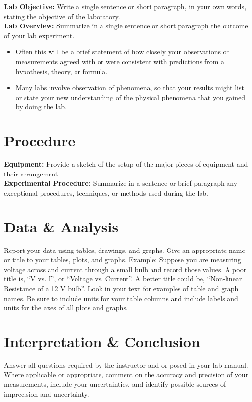 \noindent \textbf{Lab Objective:} Write a single sentence or short paragraph, in your own words, stating the objective of the laboratory.\\
\textbf{Lab Overview:} Summarize in a single sentence or short paragraph the outcome of your lab experiment.
\begin{itemize}[itemsep=0pt]
	\item Often this will be a brief statement of how closely your observations or measurements agreed with or were consistent with predictions from a hypothesis, theory, or formula.
	\item Many labs involve observation of phenomena, so that your results might list or state your new understanding of the physical phenomena that you gained by doing the lab.
\end{itemize}

\section{Procedure}
\textbf{Equipment:} Provide a sketch of the setup of the major pieces of equipment and their arrangement.\\
\textbf{Experimental Procedure:} Summarize in a sentence or brief paragraph any exceptional procedures, techniques, or methods used during the lab.

\section{Data \& Analysis}
Report your data using tables, drawings, and graphs. Give an appropriate name or title to your tables, plots, and graphs. Example: Suppose you are measuring voltage across and current through a small bulb and record those values. A   poor title is, ``V vs. I'', or ``Voltage vs. Current''. A better title could be, ``Non-linear Resistance of a 12 V bulb''. Look in your text for examples of table and graph names. Be sure to include units for your table columns and include labels and units for the axes of all plots and graphs.

\section{Interpretation \& Conclusion}
Answer all questions required by the instructor and or posed in your lab manual. Where applicable or appropriate, comment on the accuracy and precision of your measurements, include your uncertainties, and identify possible sources of imprecision and uncertainty.

